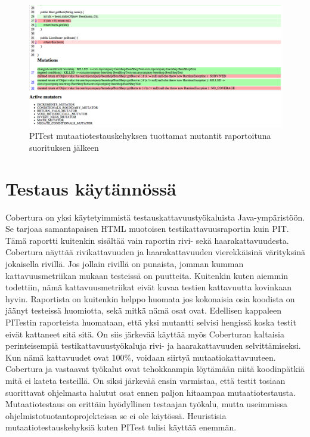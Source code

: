 \documentclass{tktltiki}
\begin{document}
\begin{figure}[here]
\centering
\caption{PITest mutaatiotestauskehyksen tuottamat mutantit raportoituna suorituksen jälkeen}
\label{fig:mutantit}
\includegraphics[scale=0.4]{freimarikuvat/mutantit.png}
\end{figure}

\section{Testaus käytännössä}
Cobertura on yksi käytetyimmistä testauskattavuustyökaluista Java-ympäristöön. Se tarjoaa samantapaisen HTML muotoisen testikattavuusraportin kuin PIT. Tämä raportti kuitenkin sisältää vain raportin rivi- sekä haarakattavuudesta. Cobertura näyttää rivikattavuuden ja haarakattavuuden vierekkäisinä värityksinä jokaisella rivillä. Jos jollain rivillä on punaista, jomman kumman kattavuusmetriikan mukaan testeissä on puutteita. Kuitenkin kuten aiemmin todettiin, nämä kattavuusmetriikat eivät kuvaa testien kattavuutta kovinkaan hyvin. Raportista on kuitenkin helppo huomata jos kokonaisia osia koodista on jäänyt testeissä huomiotta, sekä mitkä nämä osat ovat. Edellisen kappaleen PITestin raporteista huomataan, että yksi mutantti selvisi hengissä koska testit eivät kattaneet sitä sitä. On siis järkevää käyttää myös Coberturan kaltaisia perinteisempiä testikattavuustyökaluja rivi- ja haarakattavuuden selvittämiseksi. Kun nämä kattavuudet ovat 100\%, voidaan siirtyä mutaatiokattavuuteen. Cobertura ja vastaavat työkalut ovat tehokkaampia löytämään niitä koodinpätkiä mitä ei kateta testeillä. On siksi järkevää ensin varmistaa, että testit tosiaan suorittavat ohjelmasta halutut osat ennen paljon hitaampaa mutaatiotestausta. Mutaatiotestaus on erittäin hyödyllinen testaajan työkalu, mutta useimmissa ohjelmistotuotantoprojekteissa se ei ole käytössä. Heuristisia mutaatiotestauskehyksiä kuten PITest tulisi käyttää enemmän. 
\end{document}
